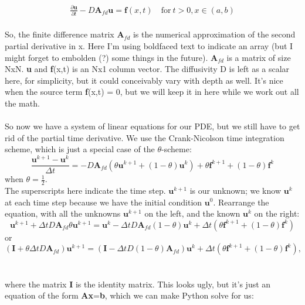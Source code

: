 \documentclass[11pt, oneside]{article}   	%
\begin{document}
\begin{gather}
\frac{\partial \textbf{u}}{\partial t} - D\textbf{A}_{fd}\textbf{u} = \mathbf{f}(x,t) \quad \text{for}\ t>0, x \in (a,b)
\end{gather}
\\
So, the finite difference matrix $\textbf{A}_{fd}$ is the numerical approximation of the second partial derivative in x. Here I'm using boldfaced text to indicate an array (but I might forget to embolden (?) some things in the future). $\textbf{A}_{fd}$ is a matrix of size NxN. \textbf {u}  and \textbf{f}(x,t) is an Nx1 column vector. The diffusivity D is left as a scalar here, for simplicity, but it could conceivably vary with depth as well. It's nice when the source term \textbf{f}(x,t) = 0, but we will keep it in here while we work out all the math. 
\\
\\
So now we have a system of linear equations for our PDE, but we still have to get rid of the partial time derivative. We use the Crank-Nicolson time integration scheme, which is just a special case of the $\theta$-scheme:
\begin{equation*}
\frac{\mathbf{u}^{k+1} - \mathbf{u}^k}{\Delta t} = -D \mathbf{A}_{fd}(\theta \mathbf{u}^{k+1} + (1 - \theta)\mathbf{u}^k) + \theta \mathbf{f}^{k+1} + (1 - \theta) \mathbf{f}^k
\end{equation*}
when $\theta = \frac{1}{2}$. 
\\
The superscripts here indicate the time step. $\mathbf{u}^{k+1}$ is our unknown; we know $\mathbf{u}^{k}$ at each time step because we have the initial condition $\mathbf{u}^{0}$. Rearrange the equation, with all the unknowns $\textbf{u}^{k+1}$ on the left, and the known $\textbf{u}^k$ on the right:
\begin{equation*}
\mathbf{u}^{k+1} + \Delta t D \mathbf{A}_{fd} \theta \mathbf{u}^{k+1}  = \mathbf{u}^k - \Delta t D \mathbf{A}_{fd} \left(1 - \theta \right) \mathbf{u}^k + \Delta t \left( \theta \mathbf{f}^{k+1} + (1 - \theta) \mathbf{f}^k \right)
\end{equation*}
or
\begin{equation}
\left(\mathbf{I} + \theta \Delta t D \mathbf{A}_{fd}\right) \mathbf{u}^{k+1} = \left( \mathbf{I} - \Delta t D (1-\theta) \mathbf{A}_{fd } \right)\mathbf{u}^{k} + \Delta t \left( \theta \mathbf{f}^{k+1} + (1 - \theta) \mathbf{f}^k \right),
\end{equation}
\\
\\
where the matrix \textbf{I} is the identity matrix. This looks ugly, but it's just an equation of the form \textbf{Ax}=\textbf{b}, which we can make Python solve for us: \\
\end{document}
